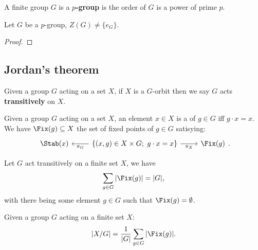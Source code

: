 \documentclass[../Year2.tex]{subfiles}
\begin{document}
\begin{definition}[$p$-group]
    A finite group $G$ is a \textbf{$p$-group} is the order of $G$ is a power of prime $p$.
\end{definition}

\begin{theorem}
    Let $G$ be a $p$-group, $Z(G)\neq \{e_G\}$.
    \begin{proof}
        
    \end{proof}
\end{theorem}

\subsection{Jordan's theorem}

\begin{definition}
    Given a group $G$ acting on a set $X$, if $X$ is a $G$-orbit then we say $G$ acts \textbf{transitively} on $X$.
\end{definition}

\begin{definition}
    Given a group $G$ acting on a set $X$, an element $x\in X$ is a  of $g\in G$ iff $g\cdot x=x$. We have $\Fix(g)\subseteq X$ the set of fixed points of $g\in G$ satisying: \[
        \begin{tikzcd}
            \Stab(x) & \arrow[l, "\pi_G"] \{(x,g)\in X\times G; \  g\cdot x = x\} \arrow[r, swap, "\pi_X"] & \Fix(g)
        \end{tikzcd}
        \black{.}
    \]
\end{definition}

\vspace{-20pt}

\begin{theorem}
    Let $G$ act transitively on a finite set $X$, we have \[
        \sum_{g\in G}|\Fix(g)| = |G|
    \black{,}
    \] with there being some element $g\in G$ such that $\Fix(g)=\emptyset$.
\end{theorem}

\begin{corollary}
    Given a group $G$ acting on a finite set $X$: \[
        |X/G| = \frac{1}{|G|}\sum_{g\in G}|\Fix(g)|
        \black{.}
    \]
\end{corollary}

\vspace{-30pt}
\end{document}
